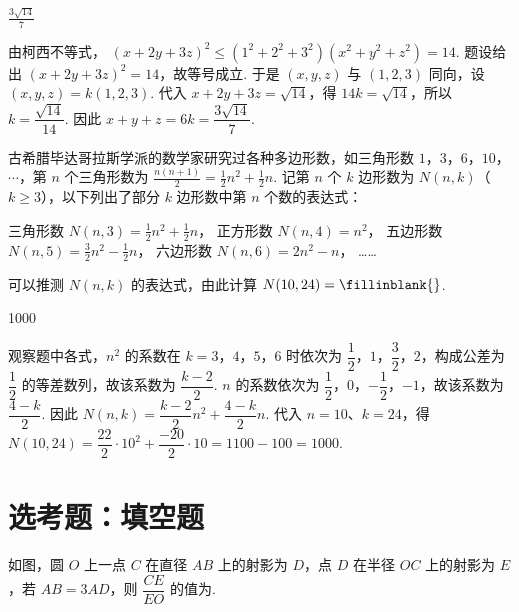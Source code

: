 \begin{answer}
\(\frac{3\sqrt{14}}{7}\)
\end{answer}

\begin{solution}
由柯西不等式，
\((x+2y+3z)^2\leqslant(1^2+2^2+3^2)(x^2+y^2+z^2)=14\).
题设给出 \((x+2y+3z)^2=14\)，故等号成立. 于是 \((x,y,z)\) 与 \((1,2,3)\) 同向，设 \((x,y,z)=k(1,2,3)\). 代入 \(x+2y+3z=\sqrt{14}\)，得 \(14k=\sqrt{14}\)，所以 \(k=\dfrac{\sqrt{14}}{14}\).
因此 \(x+y+z=6k=\dfrac{3\sqrt{14}}{7}\).
\end{solution}

\begin{problem}
古希腊毕达哥拉斯学派的数学家研究过各种多边形数，如三角形数 \(1\)，\(3\)，\(6\)，\(10\)，\(\cdots\)，第 \(n\) 个三角形数为 \(\frac{n(n + 1)}{2} = \frac{1}{2}n^2 + \frac{1}{2}n\). 记第 \(n\) 个 \(k\) 边形数为 \(N(n, k)\)（\(k \geqslant 3\)），以下列出了部分 \(k\) 边形数中第 \(n\) 个数的表达式：

三角形数 \(N(n, 3) = \frac{1}{2}n^2 + \frac{1}{2}n\)，
正方形数 \(N(n, 4) = n^2\)，
五边形数 \(N(n, 5) = \frac{3}{2}n^2 - \frac{1}{2}n\)，
六边形数 \(N(n, 6) = 2n^2 - n\)，
……

可以推测 \(N(n, k)\) 的表达式，由此计算 \(N(10, 24) =\fillinblank{}\).
\end{problem}

\begin{answer}
1000
\end{answer}

\begin{solution}
观察题中各式，\(n^2\) 的系数在 \(k=3\)，\(4\)，\(5\)，\(6\) 时依次为 \(\dfrac12\)，\(1\)，\(\dfrac32\)，\(2\)，构成公差为 \(\dfrac12\) 的等差数列，故该系数为 \(\dfrac{k-2}{2}\). \(n\) 的系数依次为 \(\dfrac12\)，\(0\)，\(-\dfrac12\)，\(-1\)，故该系数为 \(\dfrac{4-k}{2}\). 因此
\(N(n,k)=\dfrac{k-2}{2}n^2+\dfrac{4-k}{2}n\).
代入 \(n=10\)、\(k=24\)，得
\(N(10,24)=\dfrac{22}{2}\cdot10^2+\dfrac{-20}{2}\cdot10=1100-100=1000\).
\end{solution}

\section{选考题：填空题}

\begin{problem}
如图，圆 \(O\) 上一点 \(C\) 在直径 \(AB\) 上的射影为 \(D\)，点 \(D\) 在半径 \(OC\) 上的射影为 \(E\)，若 \(AB = 3AD\)，则 \(\dfrac{CE}{EO}\) 的值为\fillinblank{}.

\end{problem}

